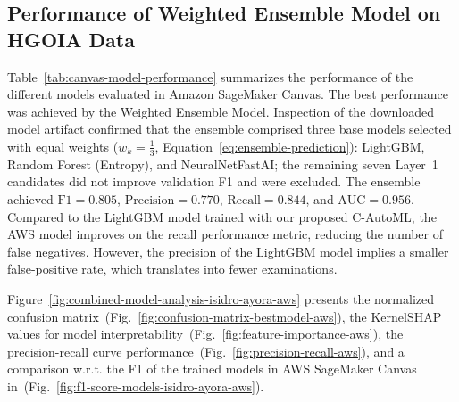 \documentclass[diagnostics,article,submit,pdftex,moreauthors]{Definitions/mdpi}
\begin{document}
\subsection{Performance of Weighted Ensemble Model on \ac{HGOIA} Data}
\label{sec:performance-aws-sage-maker-canvas}

Table~\ref{tab:canvas-model-performance} summarizes the performance of
the different models evaluated in Amazon SageMaker Canvas. The best
performance was achieved by the Weighted Ensemble Model.
Inspection of the downloaded model artifact confirmed
  that the ensemble comprised three base models selected with equal
  weights ($w_k = \tfrac{1}{3}$, Equation~\eqref{eq:ensemble-prediction}):
  LightGBM, Random Forest (Entropy), and NeuralNetFastAI; the
  remaining seven Layer~1 candidates did not improve validation
  \ac{F1} and were excluded. The ensemble achieved
$\mathrm{F1}=0.805$, $\mathrm{Precision}=0.770$, $\mathrm{Recall}=0.844$, and
$\mathrm{AUC}=0.956$. Compared to the LightGBM model trained with
our proposed \ac{C-AutoML}, the AWS model improves on the recall
performance metric, reducing the number of false negatives. However,
the precision of the LightGBM model implies a smaller
false-positive rate, which translates into fewer examinations.

Figure~\ref{fig:combined-model-analysis-isidro-ayora-aws} presents
the normalized confusion
matrix~(Fig.~\ref{fig:confusion-matrix-bestmodel-aws}), the KernelSHAP values
for model interpretability~(Fig.~\ref{fig:feature-importance-aws}), the
precision-recall curve performance~(Fig.~\ref{fig:precision-recall-aws}), and
a comparison \ac{w.r.t.} the \ac{F1} of the trained models in AWS
SageMaker Canvas in~(Fig.~\ref{fig:f1-score-models-isidro-ayora-aws}).

\end{document}

